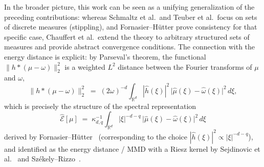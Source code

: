 \documentclass[12pt,a4paper,oneside]{amsart}
\theoremstyle{plain}
\theoremstyle{definition}
\numberwithin{equation}{section}
\numberwithin{figure}{section}
\numberwithin{table}{section}
\theoremstyle{remark}
\newcommand{\R}{\mathbb{R}}
\begin{document}
In the broader picture, this work can be seen as a unifying generalization of the
preceding contributions: whereas Schmaltz et al.\ and Teuber et al.\ focus on sets
of discrete measures (stippling), and Fornasier--H\"utter prove consistency for that
specific case, Chauffert et al.\ extend the theory to arbitrary structured sets of
measures and provide abstract convergence conditions. The connection with the energy
distance is explicit: by Parseval's theorem, the functional $\|h* (\mu - \omega)\|_2^2$
is a weighted $L^2$ distance between the Fourier transforms of $\mu$ and $\omega$,
\[
  \bigl\| h* (\mu - \omega) \bigr\|_2^2
  \;=\;
  (2\omega)^{-d}
  \int_{\R^d}
  |\hat{h}(\xi)|^2\,
  \bigl|\hat{\mu}(\xi) - \hat{\omega}(\xi)\bigr|^2
  \, d\xi,
\]
which is precisely the structure of the spectral representation
\[
  \widehat{\mathcal{E}}[\mu]
  \;=\;
  \kappa_{d,q}^{-1}
  \int_{\R^d}
  |\xi|^{-d-q}\,
  \bigl|\hat{\mu}(\xi) - \hat{\omega}(\xi)\bigr|^2
  \, d\xi
\]
derived by Fornasier--H\"utter~\cite{fornasier2014consistency}
(corresponding to the choice $|\hat{h}(\xi)|^2 \propto |\xi|^{-d-q}$),
and identified as the energy distance / MMD with a Riesz kernel by
Sejdinovic et al.~\cite{sejdinovic2013equivalence} and
Sz\'ekely--Rizzo~\cite{szekely2013energy}.
\\
\end{document}

